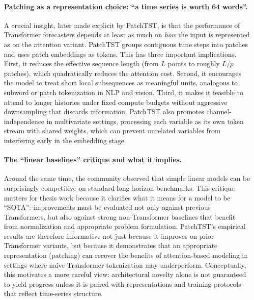 \paragraph{Patching as a representation choice: ``a time series is worth 64 words''.}
A crucial insight, later made explicit by PatchTST, is that the performance of Transformer forecasters depends at least as much on \textit{how} the input is represented as on the attention variant. PatchTST groups contiguous time steps into patches and uses patch embeddings as tokens. This has three important implications. First, it reduces the effective sequence length (from $L$ points to roughly $L/p$ patches), which quadratically reduces the attention cost. Second, it encourages the model to treat short local subsequences as meaningful units, analogous to subword or patch tokenization in NLP and vision. Third, it makes it feasible to attend to longer histories under fixed compute budgets without aggressive downsampling that discards information. PatchTST also promotes channel-independence in multivariate settings, processing each variable as its own token stream with shared weights, which can prevent unrelated variables from interfering early in the embedding stage.

\paragraph{The ``linear baselines'' critique and what it implies.}
Around the same time, the community observed that simple linear models can be surprisingly competitive on standard long-horizon benchmarks. This critique matters for thesis work because it clarifies what it means for a model to be ``SOTA'': improvements must be evaluated not only against previous Transformers, but also against strong non-Transformer baselines that benefit from normalization and appropriate problem formulation. PatchTST’s empirical results are therefore informative not just because it improves on prior Transformer variants, but because it demonstrates that an appropriate representation (patching) can recover the benefits of attention-based modeling in settings where naive Transformer tokenization may underperform. Conceptually, this motivates a more careful view: architectural novelty alone is not guaranteed to yield progress unless it is paired with representations and training protocols that reflect time-series structure.

